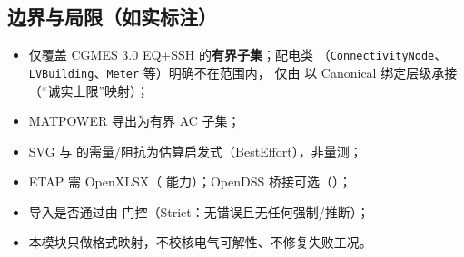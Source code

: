 \documentclass[UTF8,fontset=fandol,a4paper,11pt]{ctexart}
\begin{document}
\subsection{边界与局限（如实标注）}
\begin{itemize}
  \item {} 仅覆盖 CGMES 3.0 EQ+SSH 的\textbf{有界子集}；配电类
        （\texttt{ConnectivityNode}、\texttt{LVBuilding}、\texttt{Meter} 等）明确不在范围内，
        仅由  以 Canonical 绑定层级承接（“诚实上限”映射）；
  \item MATPOWER 导出为有界 AC 子集；
  \item SVG 与  的需量/阻抗为估算启发式（BestEffort），非量测；
  \item ETAP 需 OpenXLSX（ 能力）；OpenDSS 桥接可选（）；
  \item 导入是否通过由  门控（Strict：无错误且无任何强制/推断）；
  \item 本模块只做格式映射，不校核电气可解性、不修复失败工况。
\end{itemize}

\end{document}
